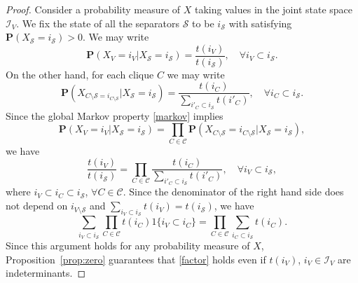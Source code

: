 \documentclass[a4paper,12pt]{article}
\theoremstyle{plain}
\theoremstyle{remark}
\begin{document}
\begin{proof}
  Consider a probability measure of $X$ taking values in
  the joint state space $\mathcal{I}_V$. We fix the state of
  all the separators $\mathcal{S}$ to be $i_{\mathcal{S}}$
  with satisfying $\mathbf{P}(X_{\mathcal{S}}=i_{\mathcal{S}})>0$.
  We may write
  \[
  \mathbf{P}(X_V=i_V|X_{\mathcal{S}}=i_{\mathcal{S}})
  =\frac{t(i_V)}{t(i_{\mathcal{S}})},
  \quad \forall i_V {\subset} i_{\mathcal{S}}.
  \]
  On the other hand, for each clique $C$ we may write
  \[
    \mathbf{P}(X_{C\setminus\mathcal{S}
    =i_{C\setminus\mathcal{S}}}|X_{\mathcal{S}}=i_{\mathcal{S}})
    =\frac{t(i_{C})}{\sum_{{i'_C\subset} i_{\mathcal{S}}}t({i'_{C}})},
    \quad \forall i_C{\subset} i_{\mathcal{S}}.
  \]
  Since the global Markov property \eqref{markov} implies
  \[
  \mathbf{P}(X_V=i_V|X_{\mathcal{S}}=i_{\mathcal{S}})
  =\prod_{C\in\mathcal{C}}\mathbf{P}(X_{C\setminus\mathcal{S}}=i_{C\setminus\mathcal{S}}|X_{\mathcal{S}}=i_{\mathcal{S}}),
  \]
  we have
  \[
    \frac{t(i_V)}{t(i_{\mathcal{S}})}=\prod_{C\in\mathcal{C}}
    \frac{t(i_{C})}{\sum_{{i'_C\subset }i_{\mathcal{S}}}t({i'_{C}})},
    \quad \forall i_V{\subset} i_{\mathcal{S}},
  \]
  where $i_V\subset i_C\subset i_{\mathcal{S}}$,
  $\forall C\in\mathcal{C}$. Since the denominator of the right
  hand side does not depend on $i_{V\setminus\mathcal{S}}$
  and
  $\sum_{i_{V}{\subset} i_\mathcal{S}}t(i_V)=t(i_{\mathcal{S}})$,
  we have
  \[
    \sum_{i_V{\subset} i_{\mathcal{S}}}\prod_{C\in\mathcal{C}}
    t(i_{C})1\{{i_V\subset i_C}\}=\prod_{C\in\mathcal{C}}
    \sum_{i_C{\subset} i_{\mathcal{S}}}t(i_{C}).
  \]
  Since this argument holds for any probability measure of $X$,
  Proposition~\ref{prop:zero} guarantees that \eqref{factor}
  holds even if $t(i_V)$, $i_V\in\mathcal{I}_V$ are indeterminants.
\end{proof}
\end{document}
